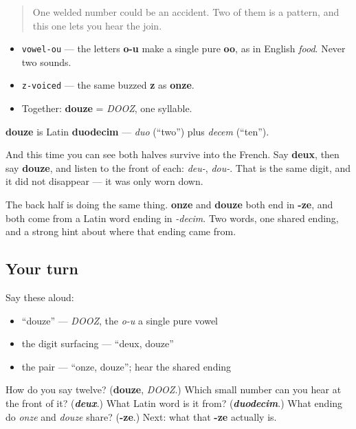\begin{quote}
One welded number could be an accident. Two of them is a pattern, and this one lets you hear the join.
\end{quote}

\begin{sounds}
\begin{itemize}
\raggedright
  \item \texttt{vowel-ou} — the letters \textbf{o-u} make a single pure \textbf{oo}, as in English \emph{food}. Never two sounds.
  \item \texttt{z-voiced} — the same buzzed \textbf{z} as \textbf{onze}.
  \item Together: \textbf{douze} = \emph{DOOZ}, one syllable.
\end{itemize}
\end{sounds}

\begin{cousinweb}
\textbf{douze} is Latin \textbf{duodecim} — \emph{duo} (\textquotedblleft{}two\textquotedblright{}) plus \emph{decem} (\textquotedblleft{}ten\textquotedblright{}).

And this time you can see both halves survive into the French. Say \textbf{deux}, then say \textbf{douze}, and listen to the front of each: \emph{deu-}, \emph{dou-}. That is the same digit, and it did not disappear — it was only worn down.

The back half is doing the same thing. \textbf{onze} and \textbf{douze} both end in \textbf{-ze}, and both come from a Latin word ending in \emph{-decim}. Two words, one shared ending, and a strong hint about where that ending came from.
\end{cousinweb}

\subsection*{Your turn}
Say these aloud:

\begin{itemize}
\raggedright
  \item \textquotedblleft{}douze\textquotedblright{} — \emph{DOOZ}, the \emph{o-u} a single pure vowel
  \item the digit surfacing — \textquotedblleft{}deux, douze\textquotedblright{}
  \item the pair — \textquotedblleft{}onze, douze\textquotedblright{}; hear the shared ending
\end{itemize}

\begin{tcolorbox}[breakable,colback=teal!4,colframe=teal!35!black,title={Before you move on}]
How do you say twelve? (\textbf{douze}, \emph{DOOZ}.) Which small number can you hear at the front of it? (\emph{\textbf{deux}}.) What Latin word is it from? (\emph{\textbf{duodecim}}.) What ending do \emph{onze} and \emph{douze} share? (\textbf{-ze}.) Next: what that \textbf{-ze} actually is.
\end{tcolorbox}
